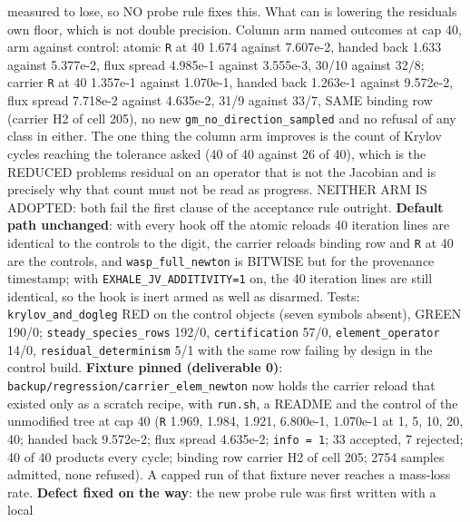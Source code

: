 \documentclass[english,a4paper]{my_memo}
\begin{document}
\begin{itemize}
  measured to lose, so NO probe rule fixes this. What can is lowering the
  residual\textquotesingle s own floor, which is not double precision.
  Column arm named outcomes at cap 40, arm against control:
  atomic \texttt{\textbar{}\textbar{}R\textbar{}\textbar{}} at 40 1.674 against 7.607e-2, handed back 1.633 against
  5.377e-2, flux spread 4.985e-1 against 3.555e-3, 30/10 against 32/8;
  carrier \texttt{\textbar{}\textbar{}R\textbar{}\textbar{}} at 40 1.357e-1 against 1.070e-1, handed back 1.263e-1
  against 9.572e-2, flux spread 7.718e-2 against 4.635e-2, 31/9 against
  33/7, SAME binding row (carrier H2 of cell 205), no new
  \texttt{gm\_no\_direction\_sampled} and no refusal of any class in either. The one
  thing the column arm improves is the count of Krylov cycles reaching the
  tolerance asked (40 of 40 against 26 of 40), which is the REDUCED
  problem\textquotesingle s residual on an operator that is not the Jacobian and is
  precisely why that count must not be read as progress. NEITHER ARM IS
  ADOPTED: both fail the first clause of the acceptance rule outright.
  \textbf{Default path unchanged}: with every hook off the atomic reload\textquotesingle s 40
  iteration lines are identical to the control\textquotesingle s to the digit, the carrier
  reload\textquotesingle s binding row and \texttt{\textbar{}\textbar{}R\textbar{}\textbar{}} at 40 are the control\textquotesingle s, and
  \texttt{wasp\_full\_newton} is BITWISE but for the provenance timestamp; with
  \texttt{EXHALE\_JV\_ADDITIVITY=1} on, the 40 iteration lines are still identical,
  so the hook is inert armed as well as disarmed. Tests: \texttt{krylov\_and\_dogleg}
  RED on the control objects (seven symbols absent), GREEN 190/0;
  \texttt{steady\_species\_rows} 192/0, \texttt{certification} 57/0, \texttt{element\_operator}
  14/0, \texttt{residual\_determinism} 5/1 with the same row failing by design in
  the control build. \textbf{Fixture pinned (deliverable 0)}:
  \texttt{backup/regression/carrier\_elem\_newton} now holds the carrier reload that
  existed only as a scratch recipe, with \texttt{run.sh}, a README and the control
  of the unmodified tree at cap 40 (\texttt{\textbar{}\textbar{}R\textbar{}\textbar{}} 1.969, 1.984, 1.921, 6.800e-1,
  1.070e-1 at 1, 5, 10, 20, 40; handed back 9.572e-2; flux spread 4.635e-2;
  \texttt{info\ =\ 1}; 33 accepted, 7 rejected; 40 of 40 products every cycle;
  binding row carrier H2 of cell 205; 2754 samples admitted, none refused).
  A capped run of that fixture never reaches a mass-loss rate. \textbf{Defect
  fixed on the way}: the new probe rule was first written with a local

\end{itemize}
\end{document}
